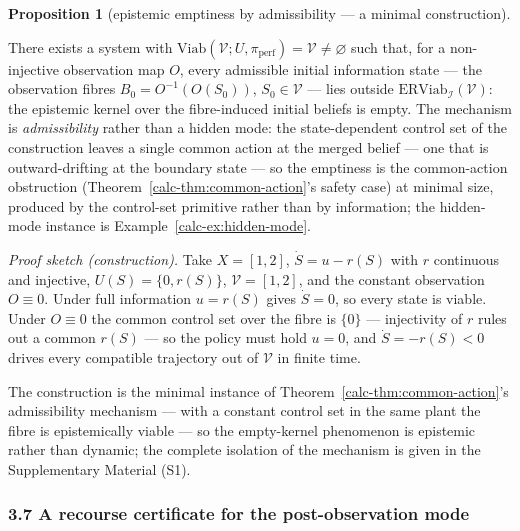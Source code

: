 \documentclass[10pt,twocolumn]{article}
\theoremstyle{definition}
\newtheorem{proposition}{Proposition}
\begin{document}
\begin{proposition}[epistemic emptiness by admissibility --- a minimal construction]\label{calc-prop:emptiness}

There exists a system with
\(\mathrm{Viab}(\mathcal{V}; U, \pi_{\mathrm{perf}}) = \mathcal{V} \neq \varnothing\)
such that, for a non-injective observation map \(O\), every admissible
initial information state --- the observation fibres
\(B_0 = O^{-1}(O(S_0))\), \(S_0 \in \mathcal{V}\) --- lies outside
\(\mathrm{ERViab}_{\mathcal{I}}(\mathcal{V})\): the epistemic kernel
over the fibre-induced initial beliefs is empty. The mechanism is \emph{admissibility} rather than a hidden mode: the
state-dependent control set of the construction leaves a single common
action at the merged belief --- one that is outward-drifting at the
boundary state --- so the emptiness is the common-action obstruction
(Theorem~\ref{calc-thm:common-action}'s safety case) at minimal size, produced by the control-set primitive rather than by information; the
hidden-mode instance is Example~\ref{calc-ex:hidden-mode}.

\end{proposition}

\emph{Proof sketch (construction).} Take \(X = [1,2]\), \(\dot S = u - r(S)\) with \(r\) continuous and injective, \(U(S) = \{0, r(S)\}\), \(\mathcal{V} = [1,2]\), and the constant observation \(O \equiv 0\). Under full information \(u = r(S)\) gives \(\dot S = 0\), so every state is viable. Under \(O \equiv 0\) the common control set over the fibre is \(\{0\}\) --- injectivity of \(r\) rules out a common \(r(S)\) --- so the policy must hold \(u = 0\), and \(\dot S = -r(S) < 0\) drives every compatible trajectory out of \(\mathcal{V}\) in finite time.

The construction is the minimal instance of Theorem~\ref{calc-thm:common-action}'s admissibility mechanism --- with a constant control set in the same plant the fibre is epistemically viable --- so the empty-kernel phenomenon is epistemic rather than dynamic; the complete isolation of the mechanism is given in the Supplementary Material (S1).

\subsubsection{3.7 A recourse certificate for the post-observation
mode}\label{calc-recourse-certificate}
\end{document}
